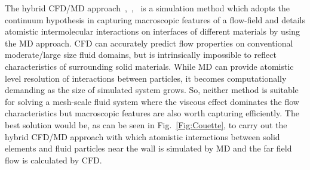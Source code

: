 \documentclass[conference,final]{IEEEtran}
\begin{document}
The hybrid CFD/MD approach~\cite{Thompson},~\cite{Nie},~\cite{Yen} is
a simulation method which adopts the continuum hypothesis in capturing
macroscopic features of a flow-field and details atomistic
intermolecular interactions on interfaces of different materials by
using the MD approach. CFD can accurately predict flow properties on
conventional moderate/large size fluid domains, but is intrinsically
impossible to reflect characteristics of surrounding solid materials.
While MD can provide atomistic level resolution of interactions
between particles, it becomes computationally demanding as the size of simulated system grows. So, neither method is suitable for solving a mesh-scale fluid system where the viscous effect dominates the flow characteristics but macroscopic features are also worth capturing efficiently. The best solution would be, as can be seen in Fig.~\ref{Fig:Couette}, to
carry out the hybrid CFD/MD approach with which atomistic
interactions between solid elements and fluid particles near the wall
is simulated by MD and the far field flow is calculated by CFD.




\end{document}
